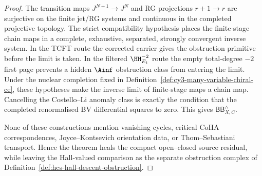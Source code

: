 \begin{proof}
The transition maps $J^{N+1}\to J^N$ and RG projections $r+1\to r$ are
surjective on the finite jet/RG systems and continuous in the completed
projective topology. The strict compatibility hypothesis places the
finite-stage chain maps in a complete, exhaustive, separated, strongly
convergent inverse system. In the TCFT route the corrected carrier gives
the obstruction primitive before the limit is taken. In the filtered
$\HH^{-2}_{E_1}$ route the empty total-degree $-2$ first page prevents a
hidden $\Ainf$ obstruction class from entering the limit. Under the
nuclear completion fixed in
Definition~\ref{def:cy3-many-variable-chiral-ce}, these hypotheses make
the inverse limit of finite-stage maps a chain map. Cancelling the
Costello--Li anomaly class is exactly the condition that the completed
renormalised BV differential squares to zero. This gives
$\mathsf{BB}^\wedge_{X,C}$.

None of these constructions mention vanishing cycles, critical CoHA
correspondences, Joyce--Kontsevich orientation data, or
Thom--Sebastiani transport. Hence the theorem heals the compact
open--closed source residual, while leaving the Hall-valued comparison
as the separate obstruction complex of
Definition~\ref{def:hcs-hall-descent-obstruction}.
\end{proof}

